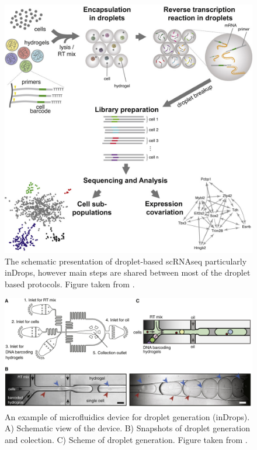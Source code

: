 \begin{figure}
  \centering
  \includegraphics[width=\linewidth]{images/scAnalysisPipeline.jpg}
  \caption{The schematic presentation of droplet-based scRNAseq
  particularly inDrops, however main steps are shared between most of the droplet based protocols.
  Figure taken from \textcite{Klein2015}.}
  \label{fig:inDropsPipeline}
\end{figure}

\begin{figure}
  \centering
  \includegraphics[width=\linewidth]{images/indropsDevice.jpg}
  \caption{An example of microfluidics device for droplet generation (inDrops).
  A) Schematic view of the device.
  B) Snapshots of droplet generation and colection.
  C) Scheme of droplet generation.
  Figure taken from \textcite{Klein2015}.}
  \label{fig:inDropsDevice}
\end{figure}


